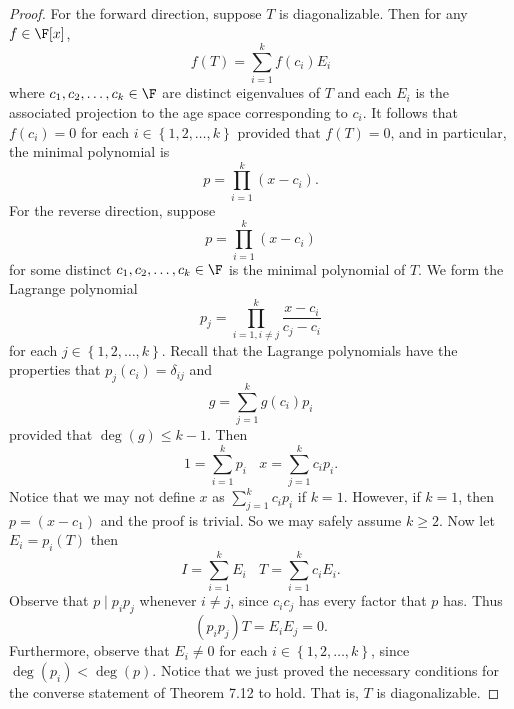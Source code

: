 \documentclass[linearalgebra]{subfiles}
\begin{document}
    \begin{proof}
        For the forward direction, suppose $T$ is diagonalizable. Then for any $f\in \F[x]$,
        \begin{equation*}
            f(T) = \sum^{k}_{i=1} f(c_i)E_i
        \end{equation*}
        where $c_1, c_2, \ldots, c_k\in \F$ are distinct eigenvalues of $T$ and each $E_i$ is the associated projection to the age space corresponding to $c_i$. It follows that $f(c_i) = 0$ for each $i\in \left\lbrace 1, 2, \ldots, k \right\rbrace$ provided that $f(T) = 0$, and in particular, the minimal polynomial is
        \begin{equation*}
            p = \prod^{k}_{i=1} (x-c_i).
        \end{equation*}
        For the reverse direction, suppose
        \begin{equation*}
            p = \prod^{k}_{i=1} (x-c_i)
        \end{equation*}
        for some distinct $c_1, c_2, \ldots, c_k\in \F$ is the minimal polynomial of $T$. We form the Lagrange polynomial
        \begin{equation*}
            p_j = \prod^{k}_{i=1,i\neq j} \frac{x-c_i}{c_j-c_i}
        \end{equation*}
        for each $j\in \left\lbrace 1, 2, \ldots, k \right\rbrace$. Recall that the Lagrange polynomials have the properties that $p_j(c_i) = \delta_{ij}$ and
        \begin{equation*}
            g = \sum^{k}_{j=1} g(c_i)p_i
        \end{equation*}
        provided that $\deg(g)\leq k-1$. Then
        \begin{equation*}
            1 = \sum^{k}_{i=1} p_i \ \ \ \ x = \sum^{k}_{j=1} c_ip_i.
        \end{equation*}
        Notice that we may not define $x$ as $\sum^{k}_{j=1} c_ip_i$ if $k = 1$. However, if $k=1$, then $p = (x-c_1)$ and the proof is trivial. So we may safely assume $k\geq 2$. Now let $E_i = p_i(T)$ then
        \begin{equation*}
            I = \sum^{k}_{i=1} E_i \ \ \ \ T = \sum^{k}_{i=1} c_iE_i.
        \end{equation*}
        Observe that $p\mid p_ip_j$ whenever $i\neq j$, since $c_ic_j$ has every factor that $p$ has. Thus
        \begin{equation*}
            \left( p_ip_j \right)T = E_iE_j = 0.
        \end{equation*}
        Furthermore, observe that $E_i\neq 0$ for each $i\in \left\lbrace 1, 2, \ldots, k \right\rbrace$, since $\deg(p_i) < \deg(p)$. Notice that we just proved the necessary conditions for the converse statement of Theorem 7.12 to hold. That is, $T$ is diagonalizable.
    \end{proof}
\end{document}

